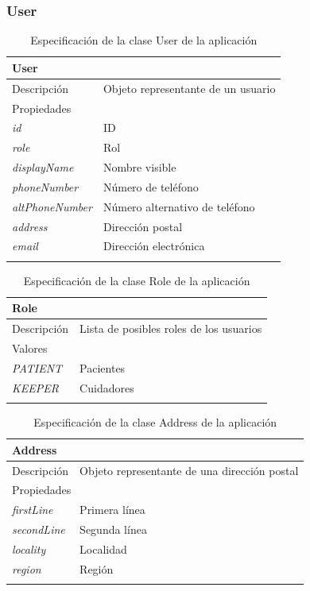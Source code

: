 \newpage
\subsubsection{User}

\begin{longtable}{|p{} p{}|}
    \hline
    \multicolumn{2}{|l|}{User} \\ \hline \hline
    Descripción      & Objeto representante de un usuario \\ \hline
    \multicolumn{2}{|l|}{Propiedades} \\
    \emph{id}  & ID \\
    \emph{role}  & Rol \\
    \emph{displayName}  & Nombre visible \\
    \emph{phoneNumber}  & Número de teléfono \\
    \emph{altPhoneNumber}  & Número alternativo de teléfono \\
    \emph{address}  & Dirección postal \\
    \emph{email}  & Dirección electrónica \\  \hline
    \caption{Especificación de la clase User de la aplicación}
    \label{class:app:user}
\end{longtable}

\begin{longtable}{|p{} p{}|}
    \hline
    \multicolumn{2}{|l|}{Role} \\ \hline \hline
    Descripción      & Lista de posibles roles de los usuarios \\ \hline
    \multicolumn{2}{|l|}{Valores} \\
    \emph{PATIENT}  & Pacientes  \\
    \emph{KEEPER}  & Cuidadores  \\ \hline
    \caption{Especificación de la clase Role de la aplicación}
    \label{class:app:role}
\end{longtable}

\begin{longtable}{|p{} p{}|}
    \hline
    \multicolumn{2}{|l|}{Address} \\ \hline \hline
    Descripción      & Objeto representante de una dirección postal \\ \hline
    \multicolumn{2}{|l|}{Propiedades} \\
    \emph{firstLine}  & Primera línea \\
    \emph{secondLine}  & Segunda línea \\
    \emph{locality}  & Localidad \\
    \emph{region}  & Región \\  \hline
    \caption{Especificación de la clase Address de la aplicación}
    \label{class:app:address}
\end{longtable}